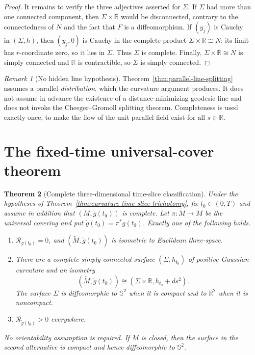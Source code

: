 \documentclass[10pt]{coll-l}
\newcommand{\R}{\mathbb{R}}
\newcommand{\Sph}{\mathbb{S}}
\newtheorem{theorem}{Theorem}[chapter]
\theoremstyle{definition}
\theoremstyle{remark}
\newtheorem{remark}[theorem]{Remark}
\numberwithin{section}{chapter}
\numberwithin{equation}{chapter}
\begin{document}
\begin{proof}
It remains to verify the three adjectives asserted for $\Sigma$.  If
$\Sigma$ had more than one connected component, then
$\Sigma\times\R$ would be disconnected, contrary to the connectedness of
$N$ and the fact that $F$ is a diffeomorphism.  If $(y_j)$ is Cauchy in
$(\Sigma,h)$, then $(y_j,0)$ is Cauchy in the complete product
$\Sigma\times\R\cong N$; its limit has $r$-coordinate zero, so it lies in
$\Sigma$.  Thus $\Sigma$ is complete.  Finally,
$\Sigma\times\R\cong N$ is simply connected and $\R$ is contractible, so
$\Sigma$ is simply connected.
\end{proof}

\begin{remark}[No hidden line hypothesis]
\label{rem:parallel-line-versus-geodesic-line}
Theorem~\ref{thm:parallel-line-splitting} assumes a parallel
\emph{distribution}, which the curvature argument produces.  It does not
assume in advance the existence of a distance-minimizing geodesic line and
does not invoke the Cheeger--Gromoll splitting theorem.  Completeness is used
exactly once, to make the flow of the unit parallel field exist for all
$s\in\R$.
\end{remark}

\section{The fixed-time universal-cover theorem}
\label{sec:curvature-fixed-time-splitting}

\begin{theorem}[Complete three-dimensional time-slice classification]
\label{thm:curvature-complete-trichotomy}
Under the hypotheses of
Theorem~\ref{thm:curvature-time-slice-trichotomy}, fix $t_0\in(0,T)$ and
assume in addition that $(M,g(t_0))$ is complete.  Let
$\pi\colon\widetilde M\to M$ be the universal covering and put
$\widetilde g(t_0)=\pi^*g(t_0)$.  Exactly one of the following holds.
\begin{enumerate}
\item $\mathcal R_{g(t_0)}=0$, and
      $(\widetilde M,\widetilde g(t_0))$ is isometric to Euclidean
      three-space.
\item There are a complete simply connected surface $(\Sigma,h_{t_0})$
      of positive Gaussian curvature and an isometry
      \begin{equation}
       (\widetilde M,\widetilde g(t_0))
          \cong(\Sigma\times\R,h_{t_0}+ds^2).             \label{eq:smp-fixed-time-product}
      \end{equation}
      The surface $\Sigma$ is diffeomorphic to $\Sph^2$ when it is compact
      and to $\R^2$ when it is noncompact.
\item $\mathcal R_{\widetilde g(t_0)}>0$ everywhere.
\end{enumerate}
No orientability assumption is required.  If $M$ is closed, then the surface
in the second alternative is compact and hence diffeomorphic to $\Sph^2$.
\end{theorem}
\end{document}
